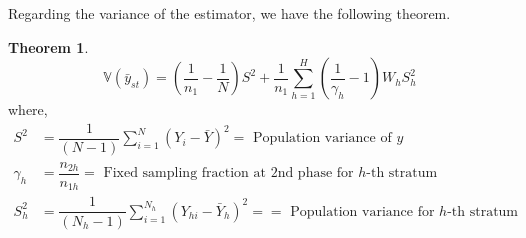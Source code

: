 \documentclass[12pt]{article}
\newcommand{\Var}{\mathbb{V}}
\theoremstyle{definition}
\newtheorem{thm}{Theorem}
\newenvironment{theorem}{
\begin{tcolorbox}[colback=green!5!white,colframe=green!75!black, parbox = false]\begin{thm} }{\end{thm}\end{tcolorbox} }
\begin{document}
Regarding the variance of the estimator, we have the following theorem.

\begin{theorem}
    $$\Var(\bar{y}_{st}) = \left( \dfrac{1}{n_1} - \dfrac{1}{N} \right)S^2 + \dfrac{1}{n_1} \sum_{h=1}^{H} \left(\dfrac{1}{\gamma_h} - 1\right) W_h S_h^2$$
    where,
    \begin{align*}
        S^2 & = \dfrac{1}{(N-1)} \sum_{i = 1}^{N} \left( Y_i - \bar{Y} \right)^2 = \text{ Population variance of } y\\
        \gamma_h & = \dfrac{n_{2h}}{n_{1h}} = \text{ Fixed sampling fraction at 2nd phase for } h \text{-th stratum}\\
        S_h^2 & = \dfrac{1}{(N_h-1)} \sum_{i = 1}^{N_h} \left( Y_{hi} - \bar{Y}_h \right)^2 = = \text{ Population variance for } h \text{-th stratum}\\
    \end{align*}
\end{theorem}
\end{document}
